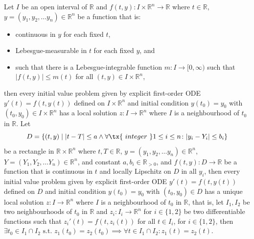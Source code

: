 \documentclass[a4paper,12pt]{report}
\begin{document}
Let $I$ be an open interval of $\mathbb{R}$ and $f(t,y)\colon I\times\mathbb{R}^n\to\mathbb{R}$ where $t\in\mathbb{R}$, $y=(y_1, y_2,\dots  y_n)\in\mathbb{R}^n$ be a function that is:
\begin{itemize}
\item continuous in $y$ for each fixed $t$,
\item Lebesgue-measurable in $t$ for each fixed $y$, and
\item such that there is a Lebesgue-integrable function $m\colon I\to [0,\infty )$ such that $|f(t,y)|\leq m(t)$ for all $(t,y)\in I\times\mathbb{R}^n$,
\end{itemize}
then every initial value problem given by explicit first-order ODE $y'(t)=f\left(t,y(t)\right)$ defined on $I\times\mathbb{R}^n$ and initial condition $y\left(t_{0}\right)=y_{0}$ with $(t_{0},y_{0})\in I\times\mathbb{R}^n$ has a local solution $z\colon I\to \mathbb {R}^n$ where $I$ is a neighbourhood of $t_0$ in $\mathbb{R}$.
Let
\[D=\{(t,y)\mid|t-T|\leq a\land\forall\tx{\ integer\ }1\leq i\leq n\colon |y_i-Y_i|\leq b_i\}\]
be a rectangle in $\mathbb{R}\times\mathbb{R}^n$ where $t,T\in\mathbb{R}$, $y=(y_1, y_2,\dots  y_n)\in\mathbb{R}^n$, $Y=(Y_1, Y_2,\dots  Y_n)\in\mathbb{R}^n$, and constant $a,b_i\in\mathbb{R}_{>0}$, and $f(t,y)\colon D\to \mathbb {R}$ be a function that is continuous in $t$ and locally Lipschitz on $D$ in all $y_i$, then every initial value problem given by explicit first-order ODE $y'(t)=f\left(t,y(t)\right)$ defined on $D$ and initial condition $y\left(t_{0}\right)=y_{0}$ with $(t_{0},y_{0})\in D$ has a unique local solution $z\colon I\to \mathbb {R}^n$ where $I$ is a neighbourhood of $t_0$ in $\mathbb {R} $, that is, let $I_1,I_2$ be two neighbourhoods of $t_0$ in $\mathbb{R}$ and $z_i\colon I_i\to\mathbb{R}^n$ for $i\in\{1,2\}$ be two differentiable functions such that $z_i'(t)=f\left(t,z_i(t)\right)$ for all $t\in I_i$, for $i\in\{1,2\}$, then $\exists t_0\in I_1\cap I_2\text{\ s.t.\ }z_1(t_0)=z_2(t_0)\implies\forall t\in I_1\cap I_2\colon z_1(t)=z_2(t)$.
\end{document}
